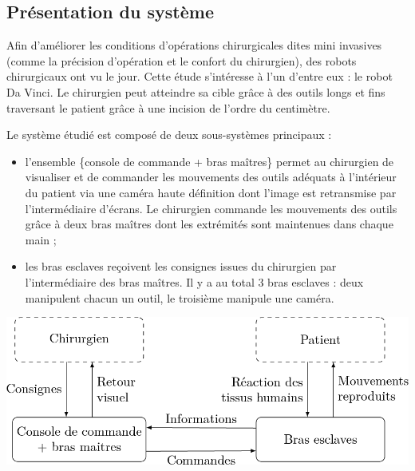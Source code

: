 \documentclass[10pt,fleqn]{article} %
\begin{document}

\vspace{4.5cm}
\pagestyle{fancy}
\thispagestyle{plain}

\def\columnseprulecolor{\color{ocre}}
\setlength{\columnseprule}{0.4pt} 

\def\pathfig{images}

\begin{multicols}{2}



\subsection*{Présentation du système}
\ifprof
\else
Afin d’améliorer les conditions d’opérations chirurgicales dites mini invasives (comme la précision d’opération
et le confort du chirurgien), des robots chirurgicaux ont vu le jour. Cette étude s’intéresse à l’un d’entre eux : le
robot Da Vinci. Le chirurgien peut atteindre sa cible grâce à des outils longs et fins traversant le patient grâce
à une incision de l’ordre du centimètre.


Le système étudié est composé de deux sous-systèmes principaux :
\begin{itemize}
\item l’ensemble \{console de commande + bras maîtres\} permet au chirurgien de visualiser et de commander les
mouvements des outils adéquats à l’intérieur du patient via une caméra haute définition dont l’image est
retransmise par l’intermédiaire d’écrans. Le chirurgien commande les mouvements des outils grâce à deux
bras maîtres dont les extrémités sont maintenues dans chaque main ;
\item les bras esclaves reçoivent les consignes issues du chirurgien par l’intermédiaire des bras maîtres. Il y a au
total 3 bras esclaves : deux manipulent chacun un outil, le troisième manipule une caméra.
\end{itemize}
\begin{center}
\includegraphics[width=\linewidth]{images/fig_02}
\end{center}


\end{multicols}
\end{document}
